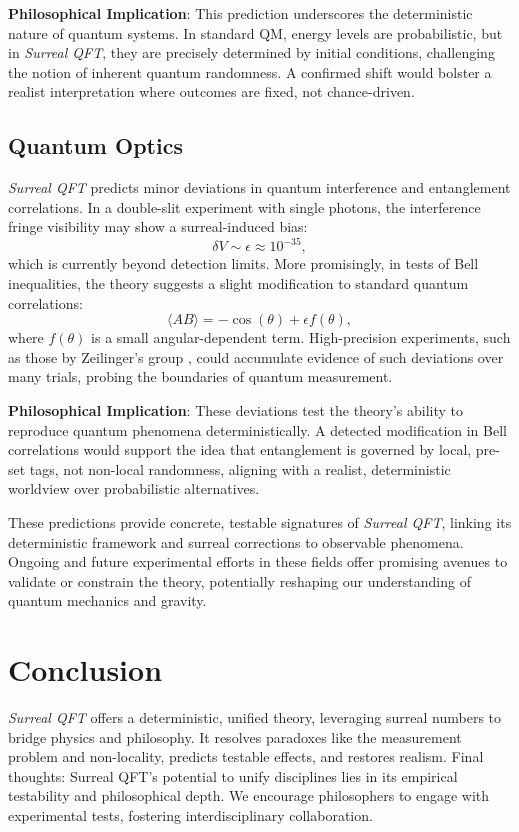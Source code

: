 \documentclass{article}
\begin{document}
\textbf{Philosophical Implication}: This prediction underscores the deterministic nature of quantum systems. In standard QM, energy levels are probabilistic, but in \textit{Surreal QFT}, they are precisely determined by initial conditions, challenging the notion of inherent quantum randomness. A confirmed shift would bolster a realist interpretation where outcomes are fixed, not chance-driven.

\subsection{Quantum Optics}
\textit{Surreal QFT} predicts minor deviations in quantum interference and entanglement correlations. In a double-slit experiment with single photons, the interference fringe visibility may show a surreal-induced bias:
\begin{equation}
\delta V \sim \epsilon \approx 10^{-35},
\end{equation}
which is currently beyond detection limits. More promisingly, in tests of Bell inequalities, the theory suggests a slight modification to standard quantum correlations:
\begin{equation}
\langle A B \rangle = -\cos(\theta) + \epsilon f(\theta),
\end{equation}
where \(f(\theta)\) is a small angular-dependent term. High-precision experiments, such as those by Zeilinger's group \cite{Zeilinger2017}, could accumulate evidence of such deviations over many trials, probing the boundaries of quantum measurement.

\textbf{Philosophical Implication}: These deviations test the theory's ability to reproduce quantum phenomena deterministically. A detected modification in Bell correlations would support the idea that entanglement is governed by local, pre-set tags, not non-local randomness, aligning with a realist, deterministic worldview over probabilistic alternatives.

These predictions provide concrete, testable signatures of \textit{Surreal QFT}, linking its deterministic framework and surreal corrections to observable phenomena. Ongoing and future experimental efforts in these fields offer promising avenues to validate or constrain the theory, potentially reshaping our understanding of quantum mechanics and gravity.

\section{Conclusion}
\textit{Surreal QFT} offers a deterministic, unified theory, leveraging surreal numbers to bridge physics and philosophy. It resolves paradoxes like the measurement problem and non-locality, predicts testable effects, and restores realism. Final thoughts: Surreal QFT's potential to unify disciplines lies in its empirical testability and philosophical depth. We encourage philosophers to engage with experimental tests, fostering interdisciplinary collaboration.
\end{document}
